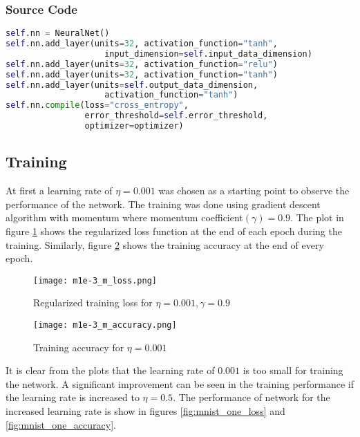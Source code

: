 \documentclass{article}
\begin{document}
\subsubsection{Source Code}
\begin{lstlisting}[language=python]
self.nn = NeuralNet()
self.nn.add_layer(units=32, activation_function="tanh",
                    input_dimension=self.input_data_dimension)
self.nn.add_layer(units=32, activation_function="relu")
self.nn.add_layer(units=32, activation_function="tanh")
self.nn.add_layer(units=self.output_data_dimension,
                    activation_function="tanh")
self.nn.compile(loss="cross_entropy",
                error_threshold=self.error_threshold,
                optimizer=optimizer)
\end{lstlisting}

\subsection{Training}
At first a learning rate of $\eta = 0.001$ was chosen as a starting point
to observe the performance of the network. The training was done using gradient
descent algorithm with momentum where momentum coefficient$(\gamma) = 0.9$.  The plot in figure \ref{fig:mnist_three_loss} shows
the regularized loss function at the end of each epoch during the training. Similarly, figure \ref{fig:mnist_three_accuracy} shows the
training accuracy at the end of every epoch.

\begin{figure}[!ht]
  \texttt{[image: m1e-3\_m\_loss.png]}
  \caption{Regularized training loss for $\eta = 0.001, \gamma = 0.9$}
  \label{fig:mnist_three_loss}
\end{figure}

\begin{figure}[!ht]
  \texttt{[image: m1e-3\_m\_accuracy.png]}
  \caption{Training accuracy for $\eta = 0.001$}
  \label{fig:mnist_three_accuracy}
\end{figure}

It is clear from the plots that the learning rate of $0.001$ is too small for training the network. A
significant improvement can be seen in the training performance if the learning rate is increased to $\eta = 0.5$.
The performance of network for the increased learning rate is show in figures \ref{fig:mnist_one_loss} and \ref{fig:mnist_one_accuracy}.
\end{document}
